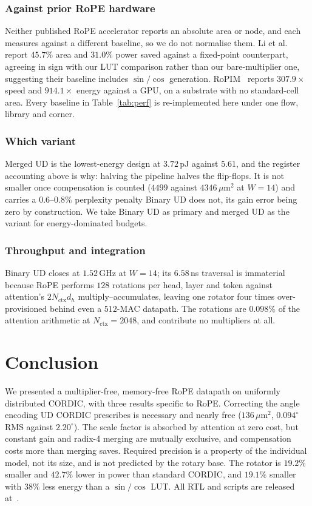 \documentclass[conference]{IEEEtran}
\begin{document}
\subsubsection{Against prior RoPE hardware}
Neither published RoPE accelerator reports an absolute area or node, and each
measures against a different baseline, so we do not normalise them. Li
et al.~\cite{standard_cordic_rope} report $45.7\%$ area and $31.0\%$ power
saved against a fixed-point counterpart, agreeing in sign with our LUT
comparison rather than our bare-multiplier one, suggesting their baseline
includes $\sin/\cos$ generation. RoPIM~\cite{c23} reports $307.9\times$ speed
and $914.1\times$ energy against a GPU, on a substrate with no standard-cell
area. Every baseline in Table~\ref{tab:perf} is re-implemented here under one
flow, library and corner.

\subsubsection{Which variant}
Merged UD is the lowest-energy design at $3.72$\,pJ against $5.61$, and the
register accounting above is why: halving the pipeline halves the flip-flops.
It is not smaller once compensation is counted ($4499$ against
$4346$\,$\mu$m$^2$ at $W=14$) and carries a $0.6$--$0.8\%$ perplexity penalty
Binary UD does not, its gain error being zero by construction. We take Binary
UD as primary and merged UD as the variant for energy-dominated budgets.

\subsubsection{Throughput and integration}
Binary UD closes at $1.52$\,GHz at $W=14$; its $6.58$\,ns traversal is
immaterial because RoPE performs $128$ rotations per head, layer and token
against attention's $2N_{\text{ctx}}d_h$ multiply--accumulates, leaving one
rotator four times over-provisioned behind even a $512$-MAC datapath. The
rotations are $0.098\%$ of the attention arithmetic at $N_{\text{ctx}}=2048$,
and contribute no multipliers at all.

\section{Conclusion}

We presented a multiplier-free, memory-free RoPE datapath on uniformly
distributed CORDIC, with three results specific to RoPE. Correcting the angle encoding UD
CORDIC prescribes is necessary and nearly free
($136$\,$\mu$m$^2$, $0.094^{\circ}$ RMS against $2.20^{\circ}$). The scale
factor is absorbed by attention at zero cost, but constant gain and radix-4
merging are mutually exclusive, and compensation costs more than merging
saves. Required precision is a property of the individual model, not its size,
and is not predicted by the rotary base. The rotator is $19.2\%$ smaller and $42.7\%$ lower in power than
standard CORDIC, and $19.1\%$ smaller with $38\%$ less energy than a
$\sin/\cos$ LUT. All RTL and scripts are released at~\cite{github}.

\balance


\end{document}
